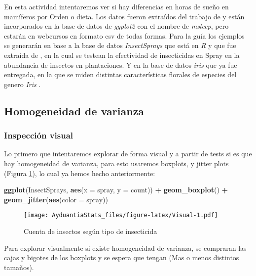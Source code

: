 \documentclass[]{book}
\newenvironment{Shaded}{\begin{snugshade}}{\end{snugshade}}
\newcommand{\KeywordTok}[1]{\textcolor[rgb]{0.13,0.29,0.53}{\textbf{#1}}}
\newcommand{\DataTypeTok}[1]{\textcolor[rgb]{0.13,0.29,0.53}{#1}}
\newcommand{\StringTok}[1]{\textcolor[rgb]{0.31,0.60,0.02}{#1}}
\newcommand{\OperatorTok}[1]{\textcolor[rgb]{0.81,0.36,0.00}{\textbf{#1}}}
\newcommand{\NormalTok}[1]{#1}
\begin{document}
En esta actividad intentaremos ver si hay diferencias en horas de sueño
en mamíferos por Orden o dieta. Los datos fueron extraídos del trabajo
de \citet{savage2007quantitative} y están incorporados en la base de
datos de \emph{ggplot2} con el nombre de \emph{msleep}, pero estarán en
webcursos en formato csv de todas formas. Para la guía los ejemplos se
generarán en base a la base de datos \emph{InsectSprays} que está en
\emph{R} y que fue extraída de \citet{beall1942transformation}, en la
cual se testean la efectividad de insecticidas en Spray en la abundancia
de insectos en plantaciones. Y en la base de datos \emph{iris} que ya
fue entregada, en la que se miden distintas características florales de
especies del genero \emph{Iris} \citep{anderson1935irises}.

\subsection{Homogeneidad de varianza}\label{homogeneidad-de-varianza}

\subsubsection{Inspección visual}\label{inspeccion-visual}

Lo primero que intentaremos explorar de forma visual y a partir de tests
si es que hay homogeneidad de varianza, para esto usaremos boxplots, y
jitter plots (Figura \ref{fig:Visual}), lo cual ya hemos hecho
anteriormente:

\begin{Shaded}
\begin{Highlighting}[]
\KeywordTok{ggplot}\NormalTok{(InsectSprays, }\KeywordTok{aes}\NormalTok{(}\DataTypeTok{x =}\NormalTok{ spray, }\DataTypeTok{y =}\NormalTok{ count)) }\OperatorTok{+}\StringTok{ }\KeywordTok{geom_boxplot}\NormalTok{() }\OperatorTok{+}\StringTok{ }\KeywordTok{geom_jitter}\NormalTok{(}\KeywordTok{aes}\NormalTok{(}\DataTypeTok{color =}\NormalTok{ spray)) }
\end{Highlighting}
\end{Shaded}

\begin{figure}
\centering
\texttt{[image: AyduantiaStats\_files/figure-latex/Visual-1.pdf]}
\caption{\label{fig:Visual}Cuenta de insectos según tipo de insecticida}
\end{figure}

Para explorar visualmente si existe homogeneidad de varianza, se
compraran las cajas y bigotes de los boxplots y se espera que tengan
(Mas o menos distintos tamaños).
\end{document}
